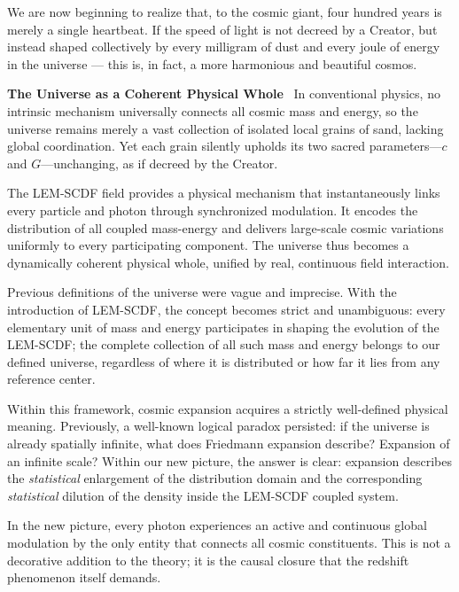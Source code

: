 \documentclass[12pt,leqno]{article}
\begin{document}
{	\medskip
	We are now beginning to realize that, to the cosmic giant, four hundred years is merely a single heartbeat. If the speed of light is not decreed by a Creator, but instead shaped collectively by every milligram of dust and every joule of energy in the universe — this is, in fact, a more harmonious and beautiful cosmos.
	
	
	
	\medskip
	\bigskip
	\textbf{The Universe as a Coherent Physical Whole}\,\,\,
	In conventional physics, no intrinsic mechanism universally connects all cosmic mass and energy, so the universe remains merely a vast collection of isolated local grains of sand, lacking global coordination. Yet each grain silently upholds its two sacred parameters—$c$ and $G$—unchanging, as if decreed by the Creator.
	
	\medskip
	The LEM-SCDF field provides a physical mechanism that instantaneously links every particle and photon through synchronized modulation. It encodes the distribution of all coupled mass-energy and delivers large-scale cosmic variations uniformly to every participating component. The universe thus becomes a dynamically coherent physical whole, unified by real, continuous field interaction.
	
	\medskip
	Previous definitions of the universe were vague and imprecise. With the introduction of LEM-SCDF, the concept becomes strict and unambiguous: every elementary unit of mass and energy participates in shaping the evolution of the LEM-SCDF; the complete collection of all such mass and energy belongs to our defined universe, regardless of where it is distributed or how far it lies from any reference center.
	
	\medskip
	Within this framework, cosmic expansion acquires a strictly well-defined physical meaning. Previously, a well-known logical paradox persisted: if the universe is already spatially infinite, what does Friedmann expansion describe? Expansion of an infinite scale? Within our new picture, the answer is clear: expansion describes the \textit{statistical} enlargement of the distribution domain and the corresponding  \textit{statistical} dilution of the density inside the LEM-SCDF coupled system.
	
	\bigskip
	In the new picture, every photon experiences an active and continuous global modulation by the only entity that connects all cosmic constituents. This is not a decorative addition to the theory; it is the causal closure that the redshift phenomenon itself demands.
	
}
\end{document}
